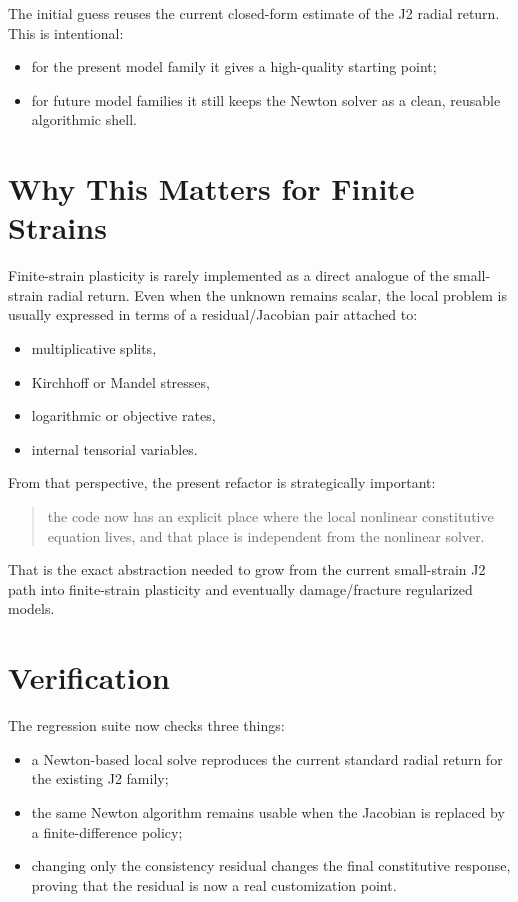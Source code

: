 The initial guess reuses the current closed-form estimate of the J2 radial
return. This is intentional:
\begin{itemize}
  \item for the present model family it gives a high-quality starting point;
  \item for future model families it still keeps the Newton solver as a clean,
        reusable algorithmic shell.
\end{itemize}

\section{Why This Matters for Finite Strains}

Finite-strain plasticity is rarely implemented as a direct analogue of the
small-strain radial return. Even when the unknown remains scalar, the local
problem is usually expressed in terms of a residual/Jacobian pair attached to:
\begin{itemize}
  \item multiplicative splits,
  \item Kirchhoff or Mandel stresses,
  \item logarithmic or objective rates,
  \item internal tensorial variables.
\end{itemize}

From that perspective, the present refactor is strategically important:
\begin{quote}
the code now has an explicit place where the local nonlinear constitutive
equation lives, and that place is independent from the nonlinear solver.
\end{quote}

That is the exact abstraction needed to grow from the current small-strain J2
path into finite-strain plasticity and eventually damage/fracture regularized
models.

\section{Verification}

The regression suite now checks three things:
\begin{itemize}
  \item a Newton-based local solve reproduces the current standard radial
        return for the existing J2 family;
  \item the same Newton algorithm remains usable when the Jacobian is replaced
        by a finite-difference policy;
  \item changing only the consistency residual changes the final constitutive
        response, proving that the residual is now a real customization point.
\end{itemize}

